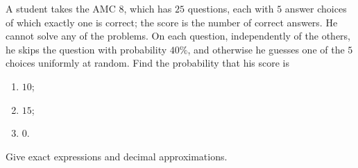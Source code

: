 A student takes the AMC 8, which has $25$ questions, each with $5$ answer choices of which exactly one is correct; the score is the number of correct answers. He cannot solve any of the problems. On each question, independently of the others, he skips the question with probability $40\%$, and otherwise he guesses one of the $5$ choices uniformly at random. Find the probability that his score is
\begin{enumerate}
\item[(a)] $10$;
\item[(b)] $15$;
\item[(c)] $0$.
\end{enumerate}
Give exact expressions and decimal approximations.
